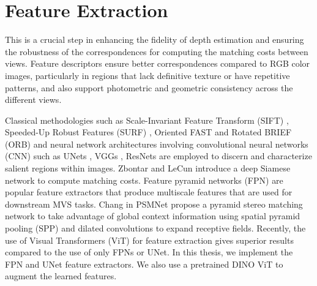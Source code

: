 \section{Feature Extraction}\label{sec:relwork-featex}
This is a crucial step in enhancing the fidelity of depth estimation and ensuring the robustness of the correspondences for computing the matching costs between views. Feature descriptors ensure better correspondences compared to RGB color images, particularly in regions that lack definitive texture or have repetitive patterns, and also support photometric and geometric consistency across the different views.\par
Classical methodologies such as Scale-Invariant Feature Transform (SIFT) \cite{lowe1999object}, Speeded-Up Robust Features (SURF) \cite{10.1007/11744023_32}, Oriented FAST and Rotated BRIEF (ORB) \cite{rublee2011} and neural network architectures involving convolutional neural networks (CNN) such as UNets \cite{ronneberger2015unet}, VGGs \cite{simonyan2015deep}, ResNets \cite{he2015deep} are employed to discern and characterize salient regions within images. Zbontar and LeCun \cite{Zbontar2016} introduce a deep Siamese network to compute matching costs. Feature pyramid networks (FPN) \cite{lin2017feature} are popular feature extractors that produce multiscale features that are used for downstream MVS tasks. Chang {\etal} in PSMNet \cite{chang2018pyramid} propose a pyramid stereo matching network to take advantage of global context information using spatial pyramid pooling (SPP) \cite{He_2014} and dilated convolutions \cite{yu2016multiscale} to expand receptive fields. Recently, the use of Visual Transformers (ViT) \cite{dosovitskiy2021image, cao2022mvsformer, ranftl2021vision, amir2021deep} for feature extraction gives superior results compared to the use of only FPNs or UNet. In this thesis, we implement the FPN and UNet feature extractors. We also use a pretrained DINO ViT to augment the learned features. 
